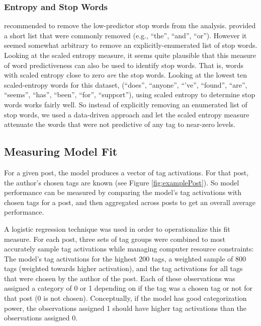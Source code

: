 \documentclass[10pt,letterpaper]{article}
\begin{document}
\subsubsection{Entropy and Stop Words}

 recommended to remove the low-predictor stop words from the analysis.
\citeauthor{Bird2009} provided a short list that were commonly removed (e.g., ``the'', ``and'', ``or'').
However it seemed somewhat arbitrary to remove an explicitly-enumerated list of stop words.
Looking at the scaled entropy measure, it seems quite plausible that this measure of word predictiveness can also be used to identify stop words.
That is, words with scaled entropy close to zero \emph{are} the stop words.
Looking at the lowest ten scaled-entropy words for this dataset, (``does'', ``anyone'', ``'ve'', ``found'', ``are'', ``seems'', ``has'', ``been'', ``for'', ``support''),
using scaled entropy to determine stop words works fairly well.
So instead of explicitly removing an enumerated list of stop words, we used a data-driven approach and let the scaled entropy measure attenuate the words that were not predictive of any tag to near-zero levels.

\subsection{Measuring Model Fit}

For a given post, the model produces a vector of tag activations.
For that post, the author's chosen tags are known (see Figure \ref{fig:examplePost}).
So model performance can be measured by comparing the model's tag activations with chosen tags for a post, and then aggregated across posts to get an overall average performance.

A logistic regression technique was used in order to operationalize this fit measure.
For each post, three sets of tag groups were combined to most accurately sample tag activations while managing computer resource constraints:
The model's tag activations for the highest 200 tags, a weighted sample of 800 tags (weighted towards higher activation), and the tag activations for all tags that were chosen by the author of the post.
Each of these observations was assigned a category of 0 or 1 depending on if the tag was a chosen tag or not for that post (0 is not chosen).
Conceptually, if the model has good categorization power, the observations assigned 1 should have higher tag activations than the observations assigned 0.
\end{document}
